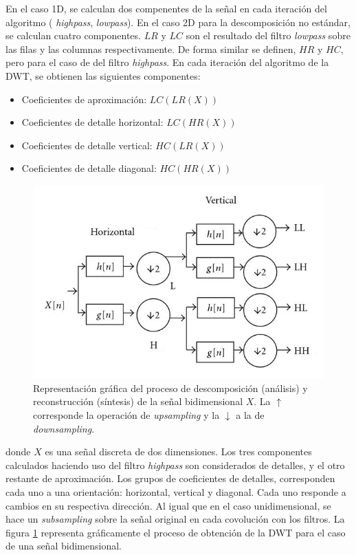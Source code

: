 En el caso 1D, se calculan dos compenentes de la señal en cada iteración del algoritmo ( \textit{highpass},
\textit{lowpass}). En el caso 2D para la descomposición no estándar, se calculan cuatro componentes. $LR$ y $LC$ son el resultado del filtro \textit{lowpass} 
sobre las filas y las columnas respectivamente. De forma similar se definen, $HR$ y $HC$, pero para el caso de
del filtro \textit{highpass}. En cada iteración del algoritmo de la DWT, se obtienen las siguientes componentes:

\begin{itemize}
	\item Coeficientes de aproximación: $LC(LR(X))$
	\item Coeficientes de detalle horizontal: $LC(HR(X))$
	\item Coeficientes de detalle vertical: $HC(LR(X))$ 
	\item Coeficientes de detalle diagonal: $HC(HR(X))$
\end{itemize}

\begin{figure}
	\begin{center}
		\includegraphics[scale=2]{Graphics/dwt-2D.png}
		\caption{Representación gráfica del proceso de descomposición (análisis) y reconstrucción (síntesis) de la señal bidimensional $X$. La $\uparrow$ corresponde la operación de \textit{upsampling} y la $\downarrow$ a la de \textit{downsampling}. }\label{fig:dwt-2D}
	\end{center}
\end{figure}

\noindent donde $X$ es una señal discreta de dos dimensiones. Los tres componentes calculados haciendo uso del 
filtro \textit{highpass} son considerados de detalles, y el otro restante de aproximación. Los grupos de coeficientes de
detalles, corresponden cada uno a una orientación: horizontal, vertical y diagonal. Cada uno responde a cambios en su
respectiva dirección. Al igual que en el caso unidimensional, se hace un \textit{subsampling} sobre la señal original
en cada covolución con los filtros. La figura \ref{fig:dwt-2D} representa gráficamente
el proceso de obtención de la DWT para el caso de una señal bidimensional.

